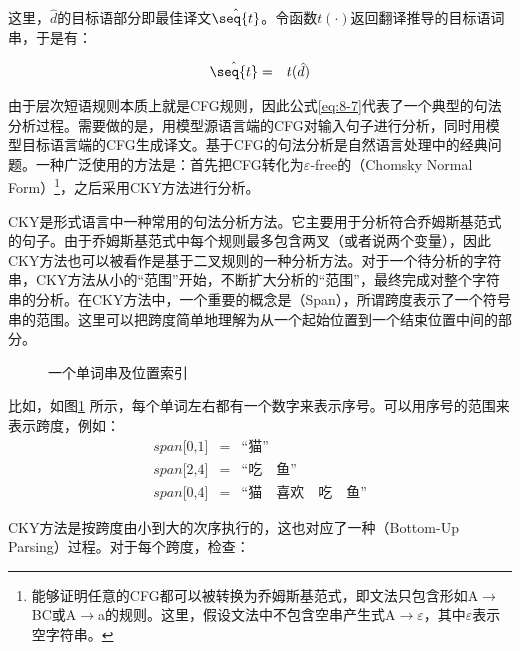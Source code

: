 \noindent 这里，$\hat{d}$的目标语部分即最佳译文$\hat{\seq{t}}$。令函数$t(\cdot)$返回翻译推导的目标语词串，于是有：

\begin{eqnarray}
\hat{\seq{t}} & = & t(\hat{d})
\label{eq:8-8}
\end{eqnarray}

\parinterval 由于层次短语规则本质上就是CFG规则，因此公式\eqref{eq:8-7}代表了一个典型的句法分析过程。需要做的是，用模型源语言端的CFG对输入句子进行分析，同时用模型目标语言端的CFG生成译文。基于CFG的句法分析是自然语言处理中的经典问题。一种广泛使用的方法是：首先把CFG转化为$\varepsilon$-free的{\small{}}（Chomsky Normal Form）\footnote[5]{能够证明任意的CFG都可以被转换为乔姆斯基范式，即文法只包含形如A$\to$BC或A$\to$a的规则。这里，假设文法中不包含空串产生式A$\to\varepsilon$，其中$\varepsilon$表示空字符串。}，之后采用CKY方法进行分析。

\parinterval CKY是形式语言中一种常用的句法分析方法。它主要用于分析符合乔姆斯基范式的句子。由于乔姆斯基范式中每个规则最多包含两叉（或者说两个变量），因此CKY方法也可以被看作是基于二叉规则的一种分析方法。对于一个待分析的字符串，CKY方法从小的“范围”开始，不断扩大分析的“范围”，最终完成对整个字符串的分析。在CKY方法中，一个重要的概念是{\small{}}（Span），所谓跨度表示了一个符号串的范围。这里可以把跨度简单地理解为从一个起始位置到一个结束位置中间的部分。

\begin{figure}[htp]
\centering

\caption{一个单词串及位置索引}
\label{fig:8-8}
\end{figure}

比如，如图\ref{fig:8-8} 所示，每个单词左右都有一个数字来表示序号。可以用序号的范围来表示跨度，例如：
\begin{eqnarray}
span\textrm{[0,1]}&=&\textrm{“猫”} \nonumber \\
span\textrm{[2,4]}&=&\textrm{“吃} \quad \textrm{鱼”} \nonumber \\
span\textrm{[0,4]}&=&\textrm{“猫} \quad \textrm{喜欢} \quad \textrm{吃} \quad \textrm{鱼”} \nonumber
\end{eqnarray}

\parinterval CKY方法是按跨度由小到大的次序执行的，这也对应了一种{\small{}}（Bottom-Up Parsing）过程。对于每个跨度，检查：

